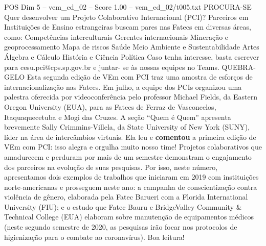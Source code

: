 \begin{textsample}{POS Dim 5 – vem\_ed\_02 – Score 1.00 – vem\_ed\_02/t005.txt}  \label{ex:f5_pos_081}
PROCURA-SE Quer desenvolver um Projeto Colaborativo Internacional (PCI)?
Parceiros em Instituições de Ensino estrangeiras buscam pares nas Fatecs em diversas áreas, como: Competências interculturais Gerentes internacionais Mineração e geoprocessamento Mapa de riscos Saúde Meio Ambiente e Sustentabilidade Artes Álgebra e Cálculo História e Ciência Política Caso tenha interesse, basta escrever para cesu.pci@cps.sp.gov.br e juntar- se às nossas equipes no Teams.
QUEBRA-GELO Esta segunda edição de VEm com PCI traz uma amostra de esforços de internacionalização nas Fatecs.
Em julho, a equipe dos PCIs organizou uma palestra oferecida por videoconferência pelo professor Michael Fields, da Eastern Oregon University (EUA), para as Fatecs de Ferraz de Vasconcelos, Itaquaquecetuba e Mogi das Cruzes.
A seção “Quem é Quem” apresenta brevemente Sally Crimmins-Villela, da State University of New York (SUNY), líder na área de intercâmbios virtuais.
Ela leu e \textbf{comentou} a primeira edição de VEm com PCI: isso alegra e orgulha muito nosso time!
Projetos colaborativos que amadurecem e perduram por mais de um semestre demonstram o engajamento dos parceiros na evolução de suas pesquisas.
Por isso, neste número, apresentamos dois exemplos de trabalhos que iniciaram em 2019 com instituições norte-americanas e prosseguem neste ano: a campanha de conscientização contra violência de gênero, elaborada pela Fatec Barueri com a Florida International University (FIU); e o estudo que Fatec Bauru e BridgeValley Community \& Technical College (EUA) elaboram sobre manutenção de equipamentos médicos (neste segundo semestre de 2020, as pesquisas irão focar nos protocolos de higienização para o combate ao coronavírus).
Boa leitura!

\end{textsample}
